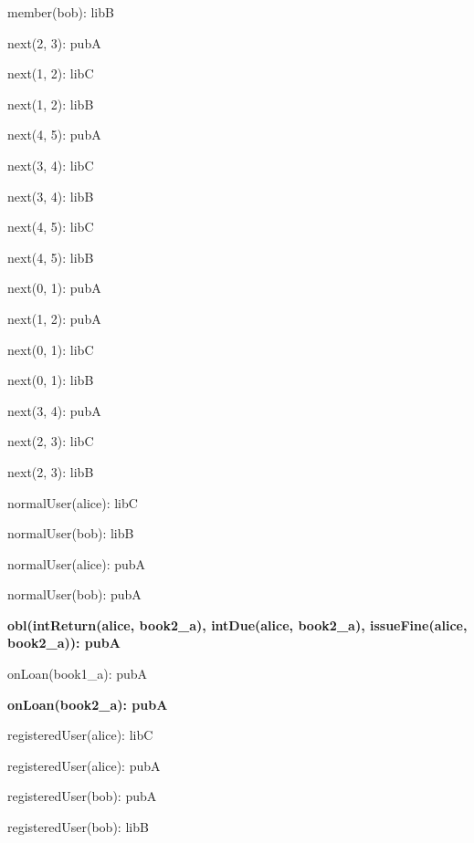 \documentclass{article}
\newenvironment{states}
        {\begin{minipage}{\tableWidth}\raggedright\begin{description}[align=left,leftmargin=1em,noitemsep,labelsep=\parindent]}
        {\end{description}\end{minipage}}
\begin{document}
{\begin{states}
\item{{member(\allowbreak{}bob): libB}}
\item{{next(\allowbreak{}2, 3): pubA}}
\item{{next(\allowbreak{}1, 2): libC}}
\item{{next(\allowbreak{}1, 2): libB}}
\item{{next(\allowbreak{}4, 5): pubA}}
\item{{next(\allowbreak{}3, 4): libC}}
\item{{next(\allowbreak{}3, 4): libB}}
\item{{next(\allowbreak{}4, 5): libC}}
\item{{next(\allowbreak{}4, 5): libB}}
\item{{next(\allowbreak{}0, 1): pubA}}
\item{{next(\allowbreak{}1, 2): pubA}}
\item{{next(\allowbreak{}0, 1): libC}}
\item{{next(\allowbreak{}0, 1): libB}}
\item{{next(\allowbreak{}3, 4): pubA}}
\item{{next(\allowbreak{}2, 3): libC}}
\item{{next(\allowbreak{}2, 3): libB}}
\item{{normalUser(\allowbreak{}alice): libC}}
\item{{normalUser(\allowbreak{}bob): libB}}
\item{{normalUser(\allowbreak{}alice): pubA}}
\item{{normalUser(\allowbreak{}bob): pubA}}
\item\textbf{{obl(\allowbreak{}intReturn(\allowbreak{}alice, book2\_a), intDue(\allowbreak{}alice, book2\_a), issueFine(\allowbreak{}alice, book2\_a)): pubA}}
\item{{onLoan(\allowbreak{}book1\_a): pubA}}
\item\textbf{{onLoan(\allowbreak{}book2\_a): pubA}}
\item{{registeredUser(\allowbreak{}alice): libC}}
\item{{registeredUser(\allowbreak{}alice): pubA}}
\item{{registeredUser(\allowbreak{}bob): pubA}}
\item{{registeredUser(\allowbreak{}bob): libB}}
\end{states}}
\end{document}
